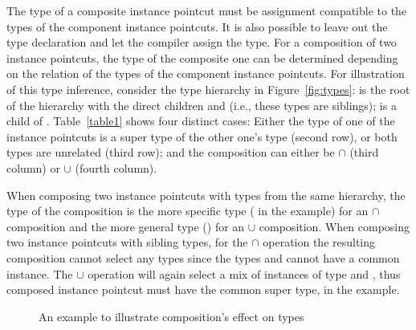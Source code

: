 The type of a composite instance pointcut must be assignment compatible to the types of the component instance pointcuts. It is also possible to leave out the type declaration and let the compiler assign the type.  For a composition of two instance pointcuts, the type of the composite one can be determined depending on the relation of the types of the component instance pointcuts. For illustration of this type inference, consider the type hierarchy in Figure~\ref{fig:types}:  is the root of the hierarchy with the direct children  and  (i.e., these types are siblings);  is a child of . Table~\ref{table1} shows four distinct cases: Either the type of one of the instance pointcuts is a super type of the other one's type (second row), or both types are unrelated (third row); and the composition can either be $\cap$ (third column) or $\cup$ (fourth column).

When composing two instance pointcuts with types from the same hierarchy, the type of the composition is the more specific type ( in the example) for an $\cap$ composition and the more general type () for an $\cup$ composition.
When composing two instance pointcuts with sibling types, for the $\cap$ operation the resulting composition cannot select any types since the types  and  cannot have a common instance. The $\cup$ operation will again select a mix of instances of type  and , thus composed instance pointcut must have the common super type,  in the example.


\begin{figure}%
\centering
{}
\hspace{40pt}
\vspace{10pt}
\caption{An example to illustrate composition's effect on types}
\label{fig:compotypes}
\end{figure}

